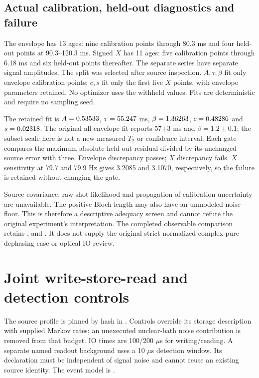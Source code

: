 \subsection{Actual calibration, held-out diagnostics and failure}
The envelope has 13 ages: nine calibration points through 80.3 ms and four held-out points at 90.3--120.3 ms. Signed $X$ has 11 ages: five calibration points through 6.18 ms and six held-out points thereafter. The separate series have separate signal amplitudes. The split was selected after source inspection. $A,\tau,\beta$ fit only envelope calibration points; $c,s$ fit only the first five $X$ points, with envelope parameters retained. No optimizer uses the withheld values. Fits are deterministic and require no sampling seed.

The retained fit is $A=0.53533{}$, $\tau=55.247{}$ ms, $\beta=1.36263{}$, $c=0.48286{}$ and $s=0.02318{}$. The original all-envelope fit reports 57$\pm$3 ms and $\beta=1.2\pm0.1$; the subset scale here is not a new measured $T_2$ or confidence interval. Each gate compares the maximum absolute held-out residual divided by its unchanged source error with three. Envelope discrepancy \BEnvelopeError{} passes; $X$ discrepancy \BXError{} fails. $X$ sensitivity at 79.7 and 79.9 Hz gives 3.2085 and 3.1070, respectively, so the failure is retained without changing the gate.

Source covariance, raw-shot likelihood and propagation of calibration uncertainty are unavailable. The positive Bloch length may also have an unmodeled noise floor. This is therefore a descriptive adequacy screen and cannot refute the original experiment's interpretation. The completed observable comparison retains ,  and . It does not supply the original strict normalized-complex pure-dephasing case or optical IO review.

\section{Joint write-store-read and detection controls}
The source profile is pinned by hash in . Controls override its storage description with supplied Markov rates; an unexecuted nuclear-bath noise contribution is removed from that budget. IO times are 100/200 $\mu$s for writing/reading. A separate named readout background uses a 10 $\mu$s detection window. Its declaration must be independent of signal noise and cannot reuse an existing source identity. The event model is .

